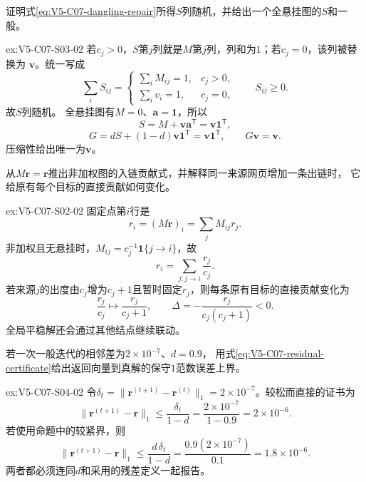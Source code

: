 \begin{SLChapterExercisePairSection}
\begin{exercise}\label{ex:V5-C07-S03-02}
证明式\eqref{eq:V5-C07-dangling-repair}所得$S$列随机，并给出一个全悬挂图的$S$和一般\PageRank{}。
\end{exercise}
\ifSLFullEdition
{}\label{sol:V5-C07-S03-02}
\begin{chapterexercisesolution}{ex:V5-C07-S03-02}
若$c_j>0$，$S$第$j$列就是$M$第$j$列，列和为$1$；若$c_j=0$，该列被替换为
$\boldsymbol v$。统一写成
\[
\sum_iS_{ij}=
\begin{cases}\sum_iM_{ij}=1,&c_j>0,\\
\sum_iv_i=1,&c_j=0,
\end{cases}
\qquad S_{ij}\ge0.
\]
故$S$列随机。
全悬挂图有$M=0$、$\boldsymbol a=\boldsymbol1$，所以
\[
S=M+\boldsymbol v\boldsymbol a^{\mathsf T}
=\boldsymbol v\boldsymbol1^{\mathsf T},
\]
\[
G=dS+(1-d)\boldsymbol v\boldsymbol1^{\mathsf T}
=\boldsymbol v\boldsymbol1^{\mathsf T},
\qquad G\boldsymbol v=\boldsymbol v.
\]
压缩性给出唯一\PageRank{}为$\boldsymbol v$。
\end{chapterexercisesolution}
\fi

\begin{exercise}\label{ex:V5-C07-S02-02}
从$M\boldsymbol r=\boldsymbol r$推出非加权图的入链贡献式，并解释同一来源网页增加一条出链时，
它给原有每个目标的直接贡献如何变化。
\end{exercise}
\ifSLFullEdition
{}\label{sol:V5-C07-S02-02}
\begin{chapterexercisesolution}{ex:V5-C07-S02-02}
固定点第$i$行是
\[
r_i=(M\boldsymbol r)_i=\sum_jM_{ij}r_j.
\]
非加权且无悬挂时，$M_{ij}=c_j^{-1}\boldsymbol1\{j\to i\}$，故
\[
r_i=\sum_{j:j\to i}\frac{r_j}{c_j}.
\]
若来源$j$的出度由$c_j$增为$c_j+1$且暂时固定$r_j$，则每条原有目标的直接贡献变化为
\[
\frac{r_j}{c_j}\longmapsto\frac{r_j}{c_j+1},\qquad
\Delta=-\frac{r_j}{c_j(c_j+1)}<0.
\]
全局平稳解还会通过其他结点继续联动。
\end{chapterexercisesolution}
\fi

\begin{exercise}\label{ex:V5-C07-S04-02}
若一次一般\PageRank{}迭代的相邻差为$2\times10^{-7}$、$d=0.9$，
用式\eqref{eq:V5-C07-residual-certificate}给出返回向量到真解的保守$1$范数误差上界。
\end{exercise}
\ifSLFullEdition
{}\label{sol:V5-C07-S04-02}
\begin{chapterexercisesolution}{ex:V5-C07-S04-02}
令$\delta_t=\|\boldsymbol r^{(t+1)}-\boldsymbol r^{(t)}\|_1=2\times10^{-7}$。较松而直接的证书为
\[
\|\boldsymbol r^{(t+1)}-\boldsymbol r\|_1
\le\frac{\delta_t}{1-d}
=\frac{2\times10^{-7}}{1-0.9}=2\times10^{-6}.
\]
若使用命题中的较紧界，则
\[
\|\boldsymbol r^{(t+1)}-\boldsymbol r\|_1
\le\frac{d\,\delta_t}{1-d}
=\frac{0.9(2\times10^{-7})}{0.1}
=1.8\times10^{-6}.
\]
两者都必须连同$d$和采用的残差定义一起报告。
\end{chapterexercisesolution}
\fi


\end{SLChapterExercisePairSection}

